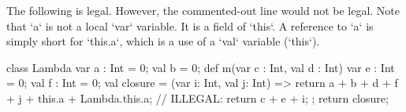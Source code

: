 \begin{eg}
 The following is legal.  
However, the commented-out line would not be legal.
Note that \xcd`a` is not a local \xcd`var` variable. It is a field of
\xcd`this`. A reference to \xcd`a` is simply short for \xcd`this.a`, which is
a use of a \xcd`val` variable (\xcd`this`).  
\begin{xten}
class Lambda {
   var a : Int = 0;
   val b = 0;
   def m(var c : Int, val d : Int) {
      var e : Int = 0;
      val f : Int = 0;
      val closure = (var i: Int, val j: Int) => {
    	  return a + b + d + f + j + this.a + Lambda.this.a;
          // ILLEGAL: return c + e + i;
      };
      return closure;
   }
}
\end{xten}
%
\end{eg}

